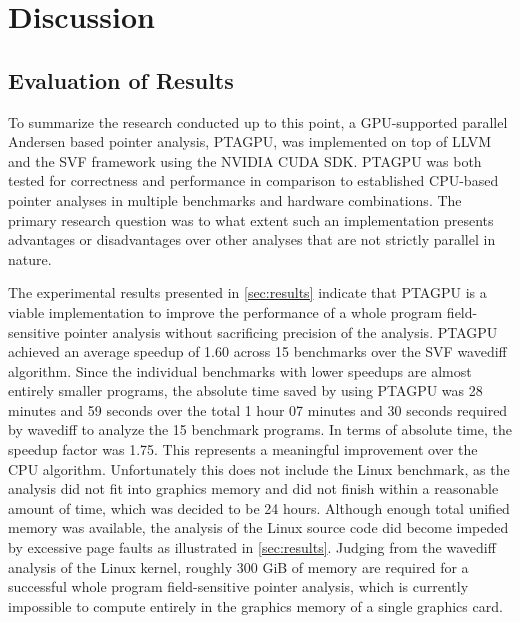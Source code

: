 \chapter{Discussion}\label{chap:conclusion}

\section{Evaluation of Results}
To summarize the research conducted up to this point, a GPU-supported parallel Andersen based pointer analysis, PTAGPU, was implemented on top of LLVM and the SVF framework using the NVIDIA CUDA SDK.
PTAGPU was both tested for correctness and performance in comparison to established CPU-based pointer analyses in multiple benchmarks and hardware combinations.
The primary research question was to what extent such an implementation presents advantages or disadvantages over other analyses that are not strictly parallel in nature.

The experimental results presented in \autoref{sec:results} indicate that PTAGPU is a viable implementation to improve the performance of a whole program field-sensitive pointer analysis without sacrificing precision of the analysis.
PTAGPU achieved an average speedup of 1.60 across 15 benchmarks over the SVF wavediff algorithm. Since the individual benchmarks with lower speedups are almost entirely smaller programs, the absolute time saved by using PTAGPU was 28 minutes and 59 seconds over the total 1 hour 07 minutes and 30 seconds required by wavediff to analyze the 15 benchmark programs. In terms of absolute time, the speedup factor was 1.75.
This represents a meaningful improvement over the CPU algorithm.
Unfortunately this does not include the Linux benchmark, as the analysis did not fit into graphics memory and did not finish within a reasonable amount of time, which was decided to be 24 hours.
Although enough total unified memory was available, the analysis of the Linux source code did become impeded by excessive page faults as illustrated in \autoref{sec:results}.
Judging from the wavediff analysis of the Linux kernel, roughly 300 GiB of memory are required for a successful whole program field-sensitive pointer analysis, which is currently impossible to compute entirely in the graphics memory of a single graphics card.

